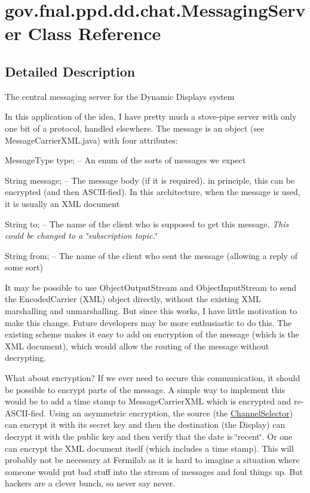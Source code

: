 \hypertarget{classgov_1_1fnal_1_1ppd_1_1dd_1_1chat_1_1MessagingServer}{\section{gov.\-fnal.\-ppd.\-dd.\-chat.\-Messaging\-Server Class Reference}
\label{classgov_1_1fnal_1_1ppd_1_1dd_1_1chat_1_1MessagingServer}
}


\subsection{Detailed Description}
The central messaging server for the Dynamic Displays system

In this application of the idea, I have pretty much a stove-\/pipe server with only one bit of a protocol, handled elsewhere. The message is an object (see Message\-Carrier\-X\-M\-L.\-java) with four attributes\-: 
\begin{DoxyItemize}
\item Message\-Type type; -- An enum of the sorts of messages we expect 
\item String message; -- The message body (if it is required). in principle, this can be encrypted (and then A\-S\-C\-I\-I-\/fied). In this architecture, when the message is used, it is usually an X\-M\-L document 
\item String to; -- The name of the client who is supposed to get this message. {\itshape This could be changed to a \char`\"{}subscription topic.\char`\"{}} 
\item String from; -- The name of the client who sent the message (allowing a reply of some sort) 
\end{DoxyItemize}

It may be possible to use Object\-Output\-Stream and Object\-Input\-Stream to send the Encoded\-Carrier (X\-M\-L) object directly, without the existing X\-M\-L marshalling and unmarshalling. But since this works, I have little motivation to make this change. Future developers may be more enthusiastic to do this. The existing scheme makes it easy to add on encryption of the message (which is the X\-M\-L document), which would allow the routing of the message without decrypting. 

What about encryption? If we ever need to secure this communication, it should be possible to encrypt parts of the message. A simple way to implement this would be to add a time stamp to Message\-Carrier\-X\-M\-L which is encrypted and re-\/\-A\-S\-C\-I\-I-\/fied. Using an asymmetric encryption, the source (the \hyperlink{classgov_1_1fnal_1_1ppd_1_1dd_1_1ChannelSelector}{Channel\-Selector}) can encrypt it with its secret key and then the destination (the Display) can decrypt it with the public key and then verify that the date is \char`\"{}recent\char`\"{}. Or one can encrypt the X\-M\-L document itself (which includes a time stamp). This will probably not be necessary at Fermilab as it is hard to imagine a situation where someone would put bad stuff into the stream of messages and foul things up. But hackers are a clever bunch, so never say never. 

